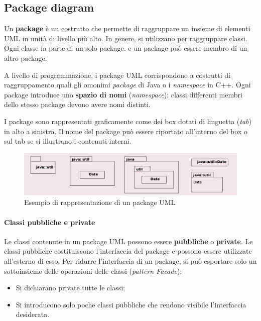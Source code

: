 \subsection{Package diagram}

Un \textbf{package} è un costrutto che permette di raggruppare un insieme di elementi UML in unità di livello più alto. In genere, si utilizzano per raggruppare classi. Ogni classe fa parte di un solo package, e un package può essere membro di un altro package.

A livello di programmazione, i package UML corrispondono a costrutti di raggruppamento quali gli omonimi \textit{package} di Java o i \textit{namespace} in C++. Ogni package introduce uno \textbf{spazio di nomi} (\textit{namespace}): classi differenti membri dello stesso package devono avere nomi distinti.

I package sono rappresentati graficamente come dei box dotati di linguetta (\textit{tab}) in alto a sinistra. Il nome del package può essere riportato all’interno del box o sul tab se si illustrano i contenuti interni.

\begin{figure}[H]
    \centering
    \includegraphics[width=0.75\linewidth]{assets/UML/package/package-1.png}
    \caption{Esempio di rappresentazione di un package UML}
\end{figure}

\paragraph{Classi pubbliche e private}
Le classi contenute in un package UML possono essere \textbf{pubbliche} o \textbf{private}. Le classi pubbliche costituiscono l’interfaccia del package e possono essere utilizzate all’esterno di esso. Per ridurre l’interfaccia di un package, si può esportare solo un sottoinsieme delle operazioni delle classi (\textit{pattern Facade}):
\begin{itemize}
    \item Si dichiarano private tutte le classi;
    \item Si introducono solo poche classi pubbliche che rendono visibile l’interfaccia desiderata.
\end{itemize}

